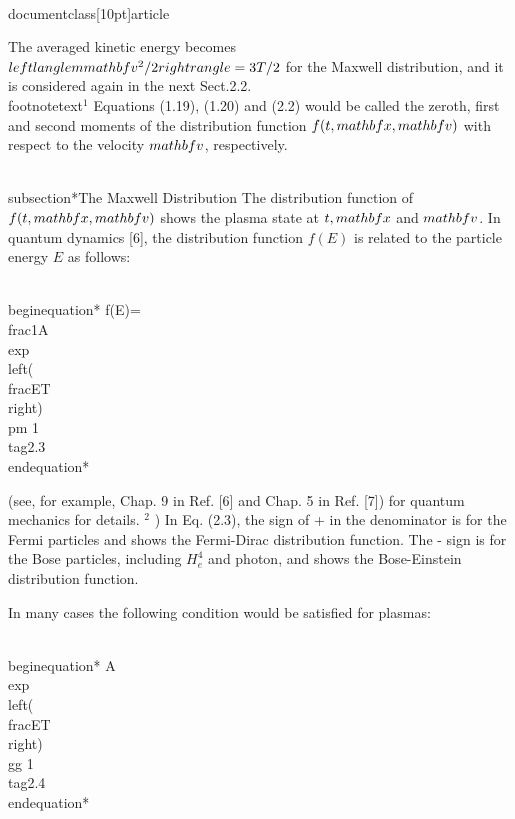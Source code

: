 \\documentclass[10pt]{article}
\begin{document}
The averaged kinetic energy becomes $\\left\\langle m \\mathbf{v}^{2} / 2\\right\\rangle=3 T / 2$ for the Maxwell distribution, and it is considered again in the next Sect.2.2.
\\footnotetext{${ }^{1}$ Equations (1.19), (1.20) and (2.2) would be called the zeroth, first and second moments of the distribution function $f(t, \\mathbf{x}, \\mathbf{v})$ with respect to the velocity $\\mathbf{v}$, respectively.
}

\\subsection*{The Maxwell Distribution}
The distribution function of $f(t, \\mathbf{x}, \\mathbf{v})$ shows the plasma state at $t, \\mathbf{x}$ and $\\mathbf{v}$. In quantum dynamics [6], the distribution function $f(E)$ is related to the particle energy $E$ as follows:


\\begin{equation*}
f(E)=\\frac{1}{A \\exp \\left(\\frac{E}{T}\\right) \\pm 1} \\tag{2.3}
\\end{equation*}


(see, for example, Chap. 9 in Ref. [6] and Chap. 5 in Ref. [7]) for quantum mechanics for details. ${ }^{2}$ ) In Eq. (2.3), the sign of + in the denominator is for the Fermi particles and shows the Fermi-Dirac distribution function. The - sign is for the Bose particles, including $H_{e}^{4}$ and photon, and shows the Bose-Einstein distribution function.

In many cases the following condition would be satisfied for plasmas:


\\begin{equation*}
A \\exp \\left(\\frac{E}{T}\\right) \\gg 1 \\tag{2.4}
\\end{equation*}
\end{document}

